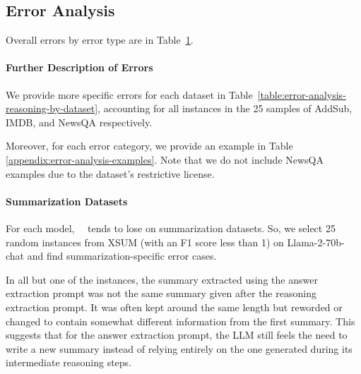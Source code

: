 \subsection{Error Analysis}
\label{sec:error-analysis}
Overall errors by error type are in Table~\ref{table:error-analysis-reasoning}.
\begin{figure}[h]
    \label{table:error-analysis-reasoning}    
    \vskip 0.1in
\centering
    \small
\end{figure}

\paragraph{Further Description of Errors} We provide more specific errors for each dataset in Table~\ref{table:error-analysis-reasoning-by-dataset}, accounting for all instances in the 25 samples of AddSub, IMDB, and NewsQA respectively.


Moreover, for each error category, we provide an example in Table \ref{appendix:error-analysis-examples}. Note that we do not include NewsQA examples due to the dataset's restrictive license. 

\paragraph{Summarization Datasets}
For each model, \zeroshotmid\ \method\ tends to lose on summarization datasets. So, we select 25 random instances from XSUM (with an F1 score less than 1) on Llama-2-70b-chat and find summarization-specific error cases.

In all but one of the instances, the summary extracted using the answer extraction prompt was not the same summary given after the reasoning extraction prompt. It was often kept around the same length but reworded or changed to contain somewhat different information from the first summary. This suggests that for the answer extraction prompt, the LLM still feels the need to write a new summary instead of relying entirely on the one generated during its intermediate reasoning steps.

